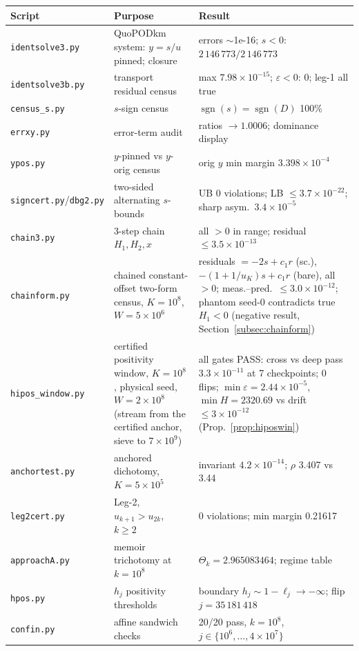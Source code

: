\documentclass[11pt]{article}
\theoremstyle{remark}
\newcommand{\eps}{\varepsilon}
\DeclareMathOperator{\sgn}{sgn}
\begin{document}
\begin{center}
\begin{tabular}{@{}lll@{}}
\toprule
Script & Purpose & Result \\
\midrule
\texttt{identsolve3.py} & QuoPODkm system: $y=s/u$ pinned; closure & errors $\sim$1e-16; $s<0$: $2\,146\,773/2\,146\,773$ \\
\texttt{identsolve3b.py} & transport residual census & max $7.98\times10^{-15}$; $\eps<0$: 0; leg-1 all true \\
\texttt{census\_s.py} & $s$-sign census & $\sgn(s)=\sgn(D)$ 100\% \\
\texttt{errxy.py} & error-term audit & ratios $\to1.0006$; dominance display \\
\texttt{ypos.py} & $y$-pinned vs $y$-orig census & orig $y$ min margin $3.398\times10^{-4}$ \\
\texttt{signcert.py}/\texttt{dbg2.py} & two-sided alternating $s$-bounds & UB 0 violations; LB $\le3.7\times10^{-22}$; sharp asym.\ $3.4\times10^{-5}$ \\
\texttt{chain3.py} & 3-step chain $H_1,H_2,x$ & all $>0$ in range; residual $\le3.5\times10^{-13}$ \\
\texttt{chainform.py} & chained constant-offset two-form census, $K=10^8$, $W=5\times10^6$ & residuals $=-2s+c_1r$ (sc.), $-(1+1/u_K)s+c_1r$ (bare), all $>0$; meas.--pred.\ $\le3.0\times10^{-12}$; phantom seed-$0$ contradicts true $H_1<0$ (negative result, Section~\ref{subsec:chainform}) \\
\texttt{hipos\_window.py} & certified positivity window, $K=10^8$, physical seed, $W=2\times10^8$ (stream from the certified anchor, sieve to $7\times10^9$) & all gates PASS: cross vs deep pass $3.3\times10^{-11}$ at 7 checkpoints; 0 flips; $\min\eps=2.44\times10^{-5}$, $\min H=2320.69$ vs drift $\le3\times10^{-12}$ (Prop.~\ref{prop:hiposwin}) \\
\texttt{anchortest.py} & anchored dichotomy, $K=5\times10^5$ & invariant $4.2\times10^{-14}$; $\rho$ 3.407 vs 3.44 \\
\texttt{leg2cert.py} & Leg-2, $u_{k+1}>u_{2k}$, $k\ge2$ & 0 violations; min margin 0.21617 \\
\texttt{approachA.py} & memoir trichotomy at $k=10^8$ & $\Theta_k=2.965083464$; regime table \\
\texttt{hpos.py} & $h_j$ positivity thresholds & boundary $h_j\sim1-\ell_j\to-\infty$; flip $j=35\,181\,418$ \\
\texttt{confin.py} & affine sandwich checks & 20/20 pass, $k=10^8$, $j\in\{10^6,\dots,4\times10^7\}$ \\

\end{tabular}
\end{center}
\end{document}
